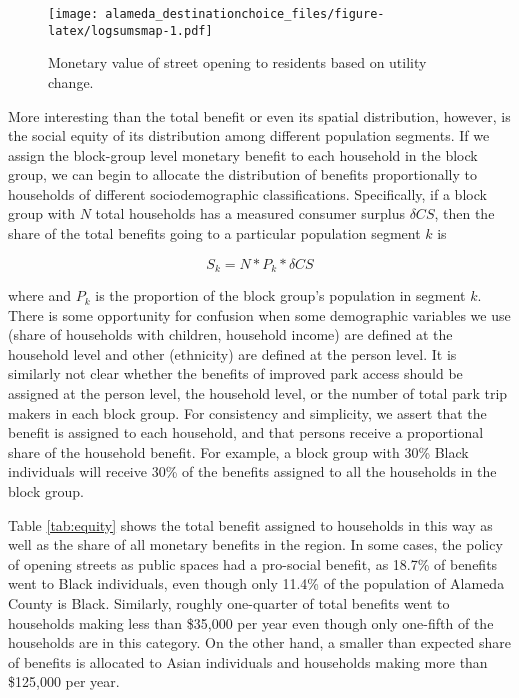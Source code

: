 \documentclass[3p, authoryear]{elsarticle} %
\makeatletter
\def\maxwidth{\ifdim\Gin@nat@width>\linewidth\linewidth
\else\Gin@nat@width\fi}
\let\Oldincludegraphics\includegraphics
\renewcommand{\includegraphics}[1]{\Oldincludegraphics[width=\maxwidth]{#1}}
\makeatother
\begin{document}
\begin{figure}
\centering
\texttt{[image: alameda\_destinationchoice\_files/figure-latex/logsumsmap-1.pdf]}
\caption{\label{fig:logsumsmap}Monetary value of street opening to residents based on utility change.}
\end{figure}

More interesting than the total benefit or even its spatial distribution, however,
is the social equity of its distribution among different population segments.
If we assign the block-group level monetary benefit to each household in the block
group, we can begin to allocate the distribution of benefits proportionally to
households of different sociodemographic classifications. Specifically, if a block
group with \(N\) total households has a measured consumer surplus \(\delta CS\), then the
share of the total benefits going to a particular population segment \(k\) is

\begin{equation}
  S_k = N * P_k * \delta CS
  \label{eq:cs-alloc}
\end{equation}

where and \(P_k\) is the proportion of the block group's population in segment \(k\).
There is some opportunity for confusion when some demographic variables we use
(share of households with children, household income) are defined at the
household level and other (ethnicity) are defined at the person level. It is similarly
not clear whether the benefits of improved park access should be assigned at
the person level, the household level, or the number of total park trip makers in
each block group. For consistency and simplicity, we assert that the benefit is
assigned to each household, and that persons receive a proportional share of the
household benefit. For example, a block group with 30\% Black individuals will
receive 30\% of the benefits assigned to all the households in the block group.

Table \ref{tab:equity} shows the total benefit assigned to households in this way
as well as the share of all monetary benefits in the region. In some cases, the
policy of opening streets as public spaces had a pro-social benefit, as 18.7\%
of benefits went to Black individuals, even though only 11.4\% of the population
of Alameda County is Black. Similarly, roughly one-quarter of total benefits
went to households making less than \$35,000 per year even though only one-fifth
of the households are in this category. On the other hand, a smaller than
expected share of benefits is allocated to Asian individuals and households making
more than \$125,000 per year.
\end{document}
